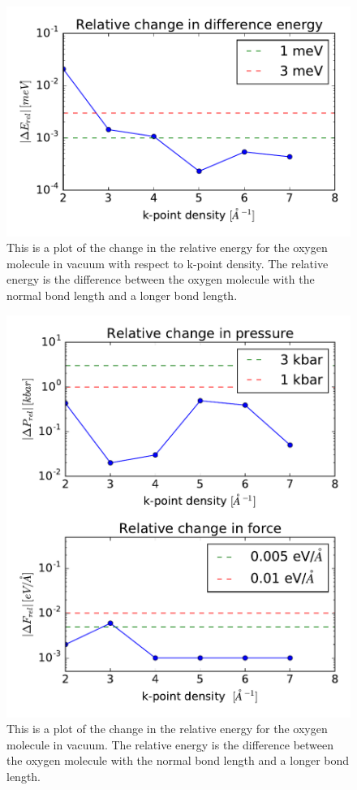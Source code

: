 \begin{figure}[H]
\includegraphics[width=\linewidth]{../fig/oxygen/deltatotencurverel_kpoints.pdf}\caption{This is a plot of the change in the relative energy for the oxygen molecule in vacuum with respect to k-point density. The relative energy is the difference between the oxygen molecule with the normal bond length and a longer bond length.}\label{fig:totenkpoint_O2}
\end{figure}

\begin{figure}[H]
\includegraphics[width=\linewidth]{../fig/oxygen/deltaforcepressrel_kpoints.pdf}\caption{This is a plot of the change in the relative energy for the oxygen molecule in vacuum. The relative energy is the difference between the oxygen molecule with the normal bond length and a longer bond length.}\label{fig:forcepresskpoint_O2}
\end{figure}